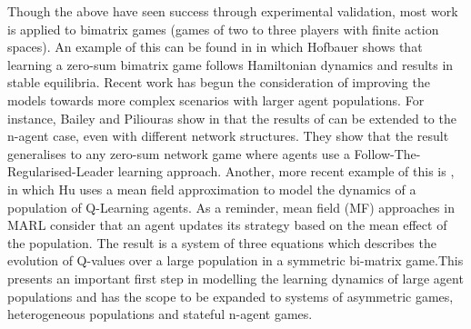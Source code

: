 \documentclass[../sample.tex]{subfiles}
\begin{document}
Though the above have seen success through experimental validation, most work is applied to bimatrix
games (games of two to three players with finite action spaces). An example of this can be found in
\cite{Hofbauer1996} in which Hofbauer shows that learning a zero-sum bimatrix game follows
Hamiltonian dynamics and results in stable equilibria. Recent work has begun the consideration of
improving the models towards more complex scenarios with larger agent populations. For instance,
Bailey and Piliouras show in \cite{Bailey2019Multi-AgentSystem} that the results of
\cite{Hofbauer1996} can be extended to the n-agent case, even with different network structures.
They show that the result generalises to any zero-sum network game where agents use a
Follow-The-Regularised-Leader learning approach. Another, more recent example of this is 
\cite{Hu2019}, in which Hu uses a mean field approximation to model the dynamics of a population of
Q-Learning agents. As a reminder, mean field (MF) approaches in MARL consider that an agent updates
its strategy based on the mean effect of the population. The result is a system of three equations
which describes the evolution of Q-values over a large population in a symmetric bi-matrix game.This
presents an important first step in modelling the learning dynamics of large agent populations and
has the scope to be expanded to systems of asymmetric games, heterogeneous populations and stateful
n-agent games.
\end{document}
